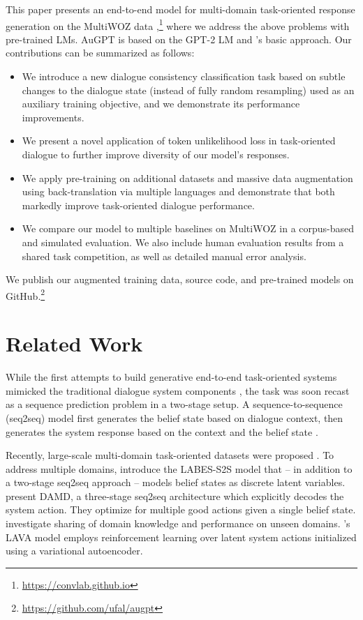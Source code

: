 \documentclass[11pt]{article}
\newcommand{\Augpt}[0]{AuGPT\xspace}
\begin{document}
This paper presents an end-to-end model for multi-domain task-oriented response generation on the MultiWOZ data \cite{budzianowski2018},\footnote{\url{https://convlab.github.io}} where we address the above problems with pre-trained LMs. \Augpt is based on the GPT-2 LM and \citet{peng2020}'s basic approach.
Our contributions can be summarized as follows:
\begin{itemize}[itemsep=0pt,topsep=2pt,leftmargin=12pt]
    \item We introduce a new dialogue consistency classification task based on subtle changes to the dialogue state (instead of fully random resampling) used as an auxiliary training objective, and we demonstrate its performance improvements.
    \item We present a novel application of token unlikelihood loss \cite{welleck2019} in task-oriented dialogue to further improve diversity of our model's responses.
    \item We apply pre-training on additional datasets and massive data augmentation using back-translation via multiple languages \cite{sennrich2016} and demonstrate that both markedly improve task-oriented dialogue performance.
    \item We compare our model to multiple baselines on MultiWOZ in a corpus-based and simulated evaluation. 
    We also include human evaluation results from a shared task competition, as well as detailed manual error analysis.
\end{itemize}
We publish our augmented training data, source code, and pre-trained models on GitHub.\footnote{\url{https://github.com/ufal/augpt}}

\section{Related Work}
\label{sec:related}

While the first attempts to build generative end-to-end task-oriented systems mimicked the traditional dialogue system components \citep{wen2017}, the task was soon recast as a sequence prediction problem in a two-stage setup. A sequence-to-sequence (seq2seq) model first generates the belief state based on dialogue context, then generates the system response based on the context and the belief state \cite[Sequicity;][]{lei2018}.

Recently, large-scale multi-domain task-oriented datasets were proposed \cite{budzianowski2018, byrne2019, rastogi2019}.
To address multiple domains, \citet{zhang2020end2end} introduce the LABES-S2S model that -- in addition to a two-stage seq2seq approach -- models belief states as discrete latent variables.
\citet{zhang2019} present DAMD, a three-stage seq2seq architecture which explicitly decodes the system action. They optimize for multiple good actions given a single belief state. \citet{qin-etal-2020-dynamic} investigate sharing of domain knowledge and performance on unseen domains.
\citet{lubis-etal-2020-lava}'s LAVA model employs reinforcement learning over latent system actions initialized using a variational autoencoder.
\end{document}
